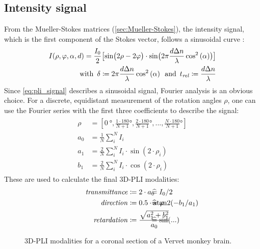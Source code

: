 \subsection{Intensity signal}\label{sec::intSignal}
%
From the Mueller-Stokes matrices (\cref{sec:Mueller-Stokes}), the intensity signal, which is the first component of the Stokes vector, follows a sinusoidal curve \cite{MenzelMaster,MenzelDissertation}:
%
\begin{align}
\label{eq:pli_signal}
\begin{split}
I(\rho, \varphi, \alpha, d) =\frac{I_0}{2}\bigl[ \sin\bigl(2\rho - 2\varphi \bigr)\cdot \sin \bigl( 2\pi\frac{d \textnormal{$\Delta n$}}{\lambda} \cos^2\left( \alpha \right) \bigr) \bigr] \\
\text{with} \enspace \delta \coloneqq 2\pi\frac{d \textnormal{$\Delta n$}}{\lambda} \cos^2\left( \alpha \right) \enspace
\text{and} \enspace \textnormal{$t_\mathit{rel}$} \coloneqq \frac{d \textnormal{$\Delta n$}}{\lambda}
\end{split}
\end{align}
%
Since \cref{eq:pli_signal} describes a sinusoidal signal, Fourier analysis is an obvious choice.
For a discrete, equidistant measurement of the rotation angles $\rho$, one can use the Fourier series with the first three coefficients to describe the signal:
%
\begin{align}
\begin{split}
\rho &= [\SI{0}{\degree}, \frac{1\cdot180}{N+1}\si{\degree}, \frac{2\cdot180}{N+1}\si{\degree}, ..., \frac{N\cdot180}{N+1}\si{\degree}]\\
a_0 &= \frac{1}{N} \sum_i^N I_i\\
a_1 &= \frac{2}{N} \sum_i^N I_i \cdot \sin(2 \cdot \rho_i)\\
b_1 &= \frac{2}{N} \sum_i^N I_i \cdot \cos(2 \cdot \rho_i)
\end{split}
\end{align}
%
These are used to calculate the final \ac{3D-PLI} modalities:
%
\begin{align}
\begin{split}
\mathit{transmittance} &\coloneqq 2 \cdot a_0 \vphantom{I_0/2} \\
\mathit{direction} &\coloneqq 0.5 \cdot \atantwo(-b_1 / a_1) \vphantom{\varphi} \\
\mathit{retardation} &\coloneqq \frac{\sqrt{a_1^2 + b_1^2}}{a_0}  \vphantom{\sin(...)}
\end{split}
\hspace{-7em}
\begin{split}
& \mathrel{\widehat{=}} I_0/2 \vphantom{2 \cdot a_0}\\
& \mathrel{\widehat{=}} \varphi \vphantom{0.5 \cdot \atantwo(-b_1 / a_1)} \\
& \mathrel{\widehat{=}} \sin(...) \vphantom{\frac{\sqrt{a_1^2 + b_1^2}}{a_0}}
\end{split}
\end{align}
%
%
\begin{figure}[t]

\caption[3D-PLI modalities]{3D-PLI modalities for a coronal section of a Vervet monkey brain.}
\end{figure}
%
%
